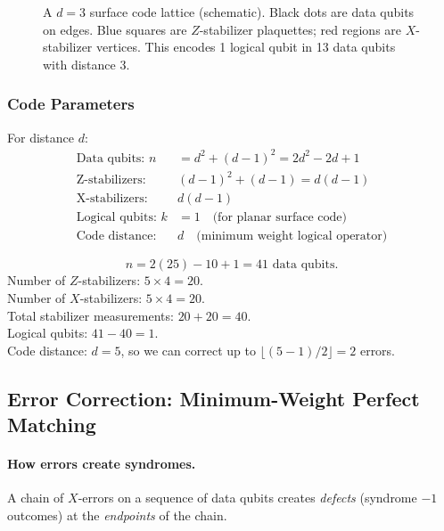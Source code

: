 \documentclass[11pt, a4paper]{article}
\theoremstyle{definition}
\theoremstyle{plain}
\theoremstyle{remark}
\begin{document}
\begin{figure}[H]
\caption{A $d=3$ surface code lattice (schematic).  Black dots are data
qubits on edges.  Blue squares are $Z$-stabilizer plaquettes; red regions
are $X$-stabilizer vertices.  This encodes 1 logical qubit in 13 data qubits
with distance 3.}
\label{fig:surface-code-lattice}
\end{figure}

\subsubsection{Code Parameters}

For distance $d$:
\begin{align}
  \text{Data qubits: } n &= d^2 + (d-1)^2 = 2d^2 - 2d + 1 \label{eq:surface-n}\\
  \text{Z-stabilizers: } &(d-1)^2 + (d-1) = d(d-1) \\
  \text{X-stabilizers: } &d(d-1)\\
  \text{Logical qubits: } k &= 1 \quad\text{(for planar surface code)}\\
  \text{Code distance: } &d \quad\text{(minimum weight logical operator)}
\end{align}

\begin{workedexample}[Parameters for $d = 5$]
\[
  n = 2(25) - 10 + 1 = 41 \text{ data qubits.}
\]
Number of $Z$-stabilizers: $5\times4 = 20$.\\
Number of $X$-stabilizers: $5\times4 = 20$.\\
Total stabilizer measurements: $20 + 20 = 40$.\\
Logical qubits: $41 - 40 = 1$. \\
Code distance: $d = 5$, so we can correct up to
$\lfloor(5-1)/2\rfloor = 2$ errors.
\end{workedexample}

\subsection{Error Correction: Minimum-Weight Perfect Matching}

\paragraph{How errors create syndromes.}
A chain of $X$-errors on a sequence of data qubits creates \emph{defects}
(syndrome $-1$ outcomes) at the \emph{endpoints} of the chain.
\end{document}
